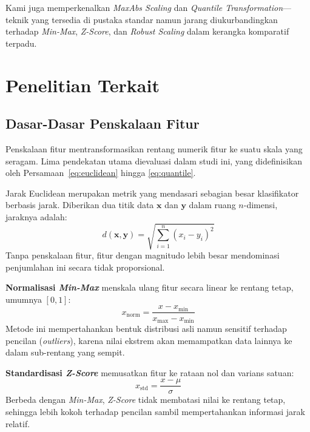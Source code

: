 \documentclass[12pt,a4paper]{article}
\begin{document}
Kami juga memperkenalkan \textit{MaxAbs Scaling} dan \textit{Quantile
Transformation}---teknik yang tersedia di pustaka standar namun jarang
diukurbandingkan terhadap \textit{Min-Max}, \textit{Z-Score}, dan
\textit{Robust Scaling} dalam kerangka komparatif terpadu.

\section{Penelitian Terkait}
\label{sec:related}

\subsection{Dasar-Dasar Penskalaan Fitur}
\label{sec:fundamentals}

Penskalaan fitur mentransformasikan rentang numerik fitur ke suatu skala yang
seragam. Lima pendekatan utama dievaluasi dalam studi ini, yang didefinisikan
oleh Persamaan~\eqref{eq:euclidean} hingga \eqref{eq:quantile}.

Jarak Euclidean merupakan metrik yang mendasari sebagian besar klasifikator
berbasis jarak. Diberikan dua titik data $\mathbf{x}$ dan $\mathbf{y}$ dalam
ruang $n$-dimensi, jaraknya adalah:
\begin{equation}
  d(\mathbf{x}, \mathbf{y}) = \sqrt{\sum_{i=1}^{n} (x_i - y_i)^2}
  \label{eq:euclidean}
\end{equation}
Tanpa penskalaan fitur, fitur dengan magnitudo lebih besar mendominasi
penjumlahan ini secara tidak proporsional.

\textbf{Normalisasi \textit{Min-Max}} menskala ulang fitur secara linear ke
rentang tetap, umumnya $[0, 1]$:
\begin{equation}
  x_{\text{norm}} = \frac{x - x_{\min}}{x_{\max} - x_{\min}}
  \label{eq:minmax}
\end{equation}
Metode ini mempertahankan bentuk distribusi asli namun sensitif terhadap pencilan
(\textit{outliers}), karena nilai ekstrem akan memampatkan data lainnya ke dalam
sub-rentang yang sempit.

\textbf{Standardisasi \textit{Z-Score}} memusatkan fitur ke rataan nol dan
varians satuan:
\begin{equation}
  x_{\text{std}} = \frac{x - \mu}{\sigma}
  \label{eq:zscore}
\end{equation}
Berbeda dengan \textit{Min-Max}, \textit{Z-Score} tidak membatasi nilai ke
rentang tetap, sehingga lebih kokoh terhadap pencilan sambil mempertahankan
informasi jarak relatif.
\end{document}
